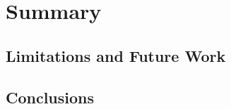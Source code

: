 \chapter{Summary}
\label{chp:summary}

\section{Limitations and Future Work}







\section{Conclusions}
